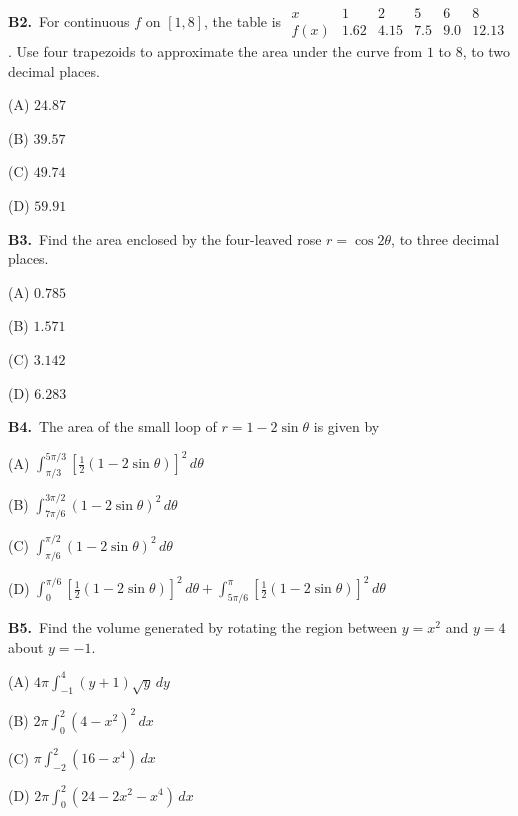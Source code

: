 \documentclass[11pt]{article}
\begin{document}
\bigskip\noindent\textbf{B2.}\ For continuous $f$ on $[1,8]$, the table is $\begin{array}{c|ccccc}x&1&2&5&6&8\\\hline f(x)&1.62&4.15&7.5&9.0&12.13\end{array}$. Use four trapezoids to approximate the area under the curve from $1$ to $8$, to two decimal places.
\begin{list}{}{\setlength{\leftmargin}{3em}\setlength{\labelwidth}{2.5em}\setlength{\itemsep}{0pt}\setlength{\topsep}{2pt}}
\item[(A)] $24.87$
\item[(B)] $39.57$
\item[(C)] $49.74$
\item[(D)] $59.91$
\end{list}

\bigskip\noindent\textbf{B3.}\ Find the area enclosed by the four-leaved rose $r=\cos2\theta$, to three decimal places.
\begin{list}{}{\setlength{\leftmargin}{3em}\setlength{\labelwidth}{2.5em}\setlength{\itemsep}{0pt}\setlength{\topsep}{2pt}}
\item[(A)] $0.785$
\item[(B)] $1.571$
\item[(C)] $3.142$
\item[(D)] $6.283$
\end{list}

\bigskip\noindent\textbf{B4.}\ The area of the small loop of $r=1-2\sin\theta$ is given by
\begin{list}{}{\setlength{\leftmargin}{3em}\setlength{\labelwidth}{2.5em}\setlength{\itemsep}{0pt}\setlength{\topsep}{2pt}}
\item[(A)] $\int_{\pi/3}^{5\pi/3}[\tfrac12(1-2\sin\theta)]^2\,d\theta$
\item[(B)] $\int_{7\pi/6}^{3\pi/2}(1-2\sin\theta)^2\,d\theta$
\item[(C)] $\int_{\pi/6}^{\pi/2}(1-2\sin\theta)^2\,d\theta$
\item[(D)] $\int_0^{\pi/6}[\tfrac12(1-2\sin\theta)]^2\,d\theta+\int_{5\pi/6}^{\pi}[\tfrac12(1-2\sin\theta)]^2\,d\theta$
\end{list}

\bigskip\noindent\textbf{B5.}\ Find the volume generated by rotating the region between $y=x^2$ and $y=4$ about $y=-1$.
\begin{list}{}{\setlength{\leftmargin}{3em}\setlength{\labelwidth}{2.5em}\setlength{\itemsep}{0pt}\setlength{\topsep}{2pt}}
\item[(A)] $4\pi\int_{-1}^4(y+1)\sqrt y\,dy$
\item[(B)] $2\pi\int_0^2(4-x^2)^2\,dx$
\item[(C)] $\pi\int_{-2}^2(16-x^4)\,dx$
\item[(D)] $2\pi\int_0^2(24-2x^2-x^4)\,dx$
\end{list}
\end{document}
